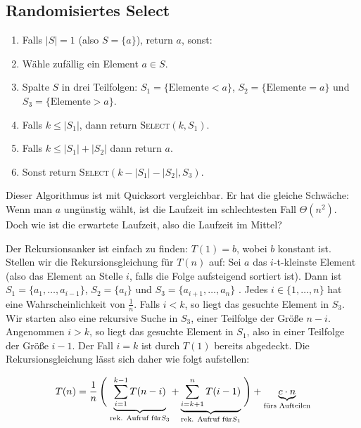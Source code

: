 \subsection{Randomisiertes Select}
\begin{Alg}[SELECT(k, S)]
	\begin{enumerate}
	  \item Falls $|S|=1$ (also $S = \lbrace a \rbrace$), return $a$, sonst:
	  \item Wähle zufällig ein Element $a \in S$.
	  \item Spalte $S$ in drei Teilfolgen: $S_1 = \lbrace\text{Elemente} < a\rbrace$, $S_2 = \lbrace\text{Elemente} = a\rbrace$ und $S_3 = \lbrace\text{Elemente} > a\rbrace$.
	  \item Falls $k \leq |S_1|$, dann return \textsc{Select}$(k, S_1)$.
	  \item Falls $k \leq |S_1| + |S_2|$ dann return $a$.
	  \item Sonst return \textsc{Select}$(k-|S_1| - |S_2|, S_3)$.
	\end{enumerate}
\end{Alg}

Dieser Algorithmus ist mit Quicksort vergleichbar. Er hat die gleiche Schwäche: Wenn man $a$ ungünstig wählt, ist die Laufzeit im schlechtesten Fall $\Theta(n^2)$. Doch wie ist die erwartete Laufzeit, also die Laufzeit im Mittel?

Der Rekursionsanker ist einfach zu finden: $T(1) = b$, wobei $b$ konstant ist. Stellen wir die Rekursionsgleichung für $T(n)$ auf: Sei $a$ das $i$-t-kleinste Element (also das Element an Stelle $i$, falls die Folge aufsteigend sortiert ist). Dann ist $S_1 = \{ a_1, \ldots, a_{i-1}\}$, $S_2 = \{ a_i \}$ und $S_3 = \{ a_{i+1}, \ldots , a_n \}$ . Jedes $i \in \{1, \ldots, n\}$ hat eine Wahrscheinlichkeit von $\frac{1}{n}$. Falls $i<k$, so liegt das gesuchte Element in $S_3$. Wir starten also eine rekursive Suche in $S_3$, einer Teilfolge der Größe $n-i$. Angenommen $i > k$, so liegt das gesuchte Element in $S_1$, also in einer Teilfolge der Größe $i-1$. Der Fall $i=k$ ist durch $T(1)$ bereits abgedeckt. Die Rekursionsgleichung lässt sich daher wie folgt aufstellen:

\[ T(n) = \frac{1}{n} \left(\vphantom{\sum_{i=1}^{k-1}}\right. \underbrace{\sum_{i=1}^{k-1} T(n-i)}_{\text{rek. Aufruf für} S_3} + \underbrace{\sum_{i=k+1}^{n} T(i-1)}_{\text{rek. Aufruf für} S_1} \left.\vphantom{\sum_{i=1}^{k-1}}\right) + \underbrace{c \cdot n}_{\text{fürs Aufteilen}}\]

